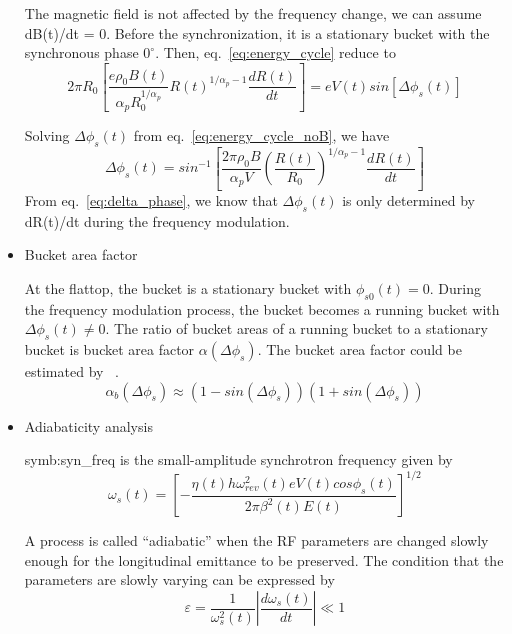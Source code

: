 \begin{itemize}
The magnetic field is not affected by the frequency change, we can assume dB(t)/dt = 0. Before the synchronization, it is a stationary bucket with the synchronous phase $0^\circ$. Then, eq.~\ref{eq:energy_cycle} reduce to
\begin{equation}
2\pi R_0 [\frac {e\rho_0B(t)}{\alpha_pR_0^{1/\alpha_p}}R(t)^{1/\alpha_p-1}\frac{dR(t)}{dt}]=eV(t)sin[\Delta \phi_s(t)]
\label{eq:energy_cycle_noB}
\end{equation} 

Solving  $\Delta \phi_{s}(t)$  from eq.~\ref{eq:energy_cycle_noB}, we have
\begin{equation}
\Delta \phi_{s}(t)=sin^{-1}[{\frac{2\pi \rho_0 B}{\alpha_pV}(\frac{R(t)}{R_0})^{1/\alpha_p-1}\frac{dR(t)}{dt}}]
\label{eq:delta_phase}
\end{equation} 
From eq.~\ref{eq:delta_phase}, we know that $\Delta \phi_{s}(t)$ is only determined by dR(t)/dt during the frequency modulation.
\item Bucket area factor

At the flattop, the bucket is a stationary bucket with $\phi_{s0}(t)=0$. During the frequency modulation process, the bucket becomes a running bucket with $\Delta\phi_s(t)\ne0$. The ratio of bucket areas of a running bucket to a stationary bucket is bucket area factor $\alpha(\Delta \phi_s)$. 
The bucket area factor could be estimated by ~\cite{lee_accelerator_2011}.
\begin{equation}
\alpha_b(\Delta\phi_s)\approx(1-sin(\Delta \phi_s))(1+sin(\Delta \phi_s))
\label{eq:buckt_area_factor}
\end{equation} 

\item Adiabaticity analysis

\gls{symb:syn_freq} is the small-amplitude synchrotron frequency given by
\begin{equation}
\omega_s(t) =[{-\frac{\eta(t)h\omega_{rev}^2(t)eV(t)cos{\phi_s(t)}}{2\pi\beta^2(t)E(t)}}]^{1/2}
\label{eq:synchfreq}
\end{equation} 

A process is called “adiabatic” when the RF parameters are changed slowly enough for the longitudinal emittance to be preserved. The condition that the parameters are slowly varying can be expressed by
\begin{equation}
\varepsilon=\frac{1}{\omega_s^2(t)}|\frac{d\omega_s(t)}{dt}| \ll 1
\label{eq:adiabaticity}
\end{equation} 


\end{itemize}
